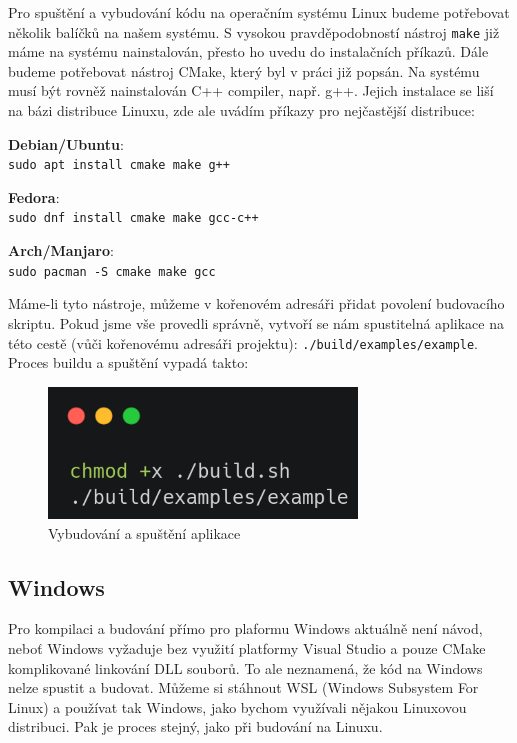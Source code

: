 \documentclass[12pt]{article}
\begin{document}
Pro spuštění a vybudování kódu na operačním systému Linux budeme potřebovat několik balíčků na našem systému. S vysokou pravděpodobností nástroj \texttt{make} již máme na systému nainstalován, přesto ho uvedu do instalačních příkazů. Dále budeme potřebovat nástroj CMake, který byl v práci již popsán. Na systému musí být rovněž nainstalován C++ compiler, např. g++. Jejich instalace se liší na bázi distribuce Linuxu, zde ale uvádím příkazy pro nejčastější distribuce:

\noindent\textbf{Debian/Ubuntu}:\\
\texttt{sudo apt install cmake make g++}

\noindent\textbf{Fedora}:\\
\texttt{sudo dnf install cmake make gcc-c++}

\noindent\textbf{Arch/Manjaro}:\\
\texttt{sudo pacman -S cmake make gcc}

Máme-li tyto nástroje, můžeme v kořenovém adresáři přidat povolení budovacího skriptu. Pokud jsme vše provedli správně, vytvoří se nám spustitelná aplikace na této cestě (vůči kořenovému adresáři projektu): \texttt{./build/examples/example}. Proces buildu a spuštění vypadá takto:

\vspace{0.5cm}
\begin{figure}[!h]
    \centering
    \includegraphics[height=3.5cm]{images/build.png}
    \caption{Vybudování a spuštění aplikace}
    \label{fig:Vybudování a spuštění aplikace}
\end{figure}

\subsection{Windows}

Pro kompilaci a budování přímo pro plaformu Windows aktuálně není návod, neboť Windows vyžaduje bez využití platformy Visual Studio a pouze CMake komplikované linkování DLL souborů. To ale neznamená, že kód na Windows nelze spustit a budovat. Můžeme si stáhnout WSL (Windows Subsystem For Linux) a používat tak Windows, jako bychom využívali nějakou Linuxovou distribuci. Pak je proces stejný, jako při budování na Linuxu.
\end{document}
